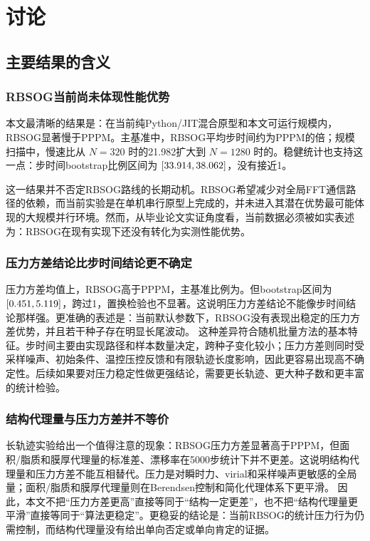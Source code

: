 \chapter{讨论}\label{chap:discussion}

\section{主要结果的含义}

\subsection{RBSOG当前尚未体现性能优势}

本文最清晰的结果是：在当前纯Python/JIT混合原型和本文可运行规模内，RBSOG显著慢于PPPM。主基准中，RBSOG平均步时间约为PPPM的\RBSOGSlowdownVsPPPM 倍；规模扫描中，慢速比从 $N=320$ 时的21.982扩大到 $N=1280$ 时的\ScalingSlowdownAtMaxN。稳健统计也支持这一点：步时间bootstrap比例区间为 $[33.914,38.062]$，没有接近1。

这一结果并不否定RBSOG路线的长期动机。RBSOG希望减少对全局FFT通信路径的依赖，而当前实验是在单机串行原型上完成的，并未进入其潜在优势最可能体现的大规模并行环境。然而，从毕业论文实证角度看，当前数据必须被如实表述为：RBSOG在现有实现下还没有转化为实测性能优势。

\subsection{压力方差结论比步时间结论更不确定}

压力方差均值上，RBSOG高于PPPM，主基准比例为\BootstrapVarianceRatio。但bootstrap区间为 $[0.451,5.119]$，跨过1，置换检验也不显著。这说明压力方差结论不能像步时间结论那样强。更准确的表述是：当前默认参数下，RBSOG没有表现出稳定的压力方差优势，并且若干种子存在明显长尾波动。
这种差异符合随机批量方法的基本特征。步时间主要由实现路径和样本数量决定，跨种子变化较小；压力方差则同时受采样噪声、初始条件、温控压控反馈和有限轨迹长度影响，因此更容易出现高不确定性。后续如果要对压力稳定性做更强结论，需要更长轨迹、更大种子数和更丰富的统计检验。

\subsection{结构代理量与压力方差并不等价}

长轨迹实验给出一个值得注意的现象：RBSOG压力方差显著高于PPPM，但面积/脂质和膜厚代理量的标准差、漂移率在5000步统计下并不更差。这说明结构代理量和压力方差不能互相替代。压力是对瞬时力、virial和采样噪声更敏感的全局量；面积/脂质和膜厚代理量则在Berendsen控制和简化代理体系下更平滑。
因此，本文不把“压力方差更高”直接等同于“结构一定更差”，也不把“结构代理量更平滑”直接等同于“算法更稳定”。更稳妥的结论是：当前RBSOG的统计压力行为仍需控制，而结构代理量没有给出单向否定或单向肯定的证据。

